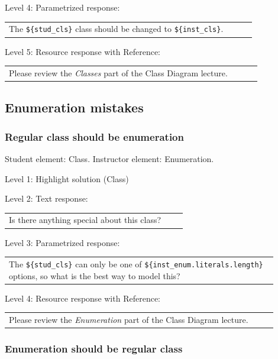 \noindent Level 4: Parametrized response: \medskip

\begin{tabular}{|p{0.9\linewidth}}
The \verb|${stud_cls}| class should be changed to \verb|${inst_cls}|.
\end{tabular} \medskip

\noindent Level 5: Resource response with Reference: \medskip

\begin{tabular}{|p{0.9\linewidth}}
Please review the \textit{Classes} part of the Class Diagram lecture.
\end{tabular} \medskip


\subsection{Enumeration mistakes}

\subsubsection{Regular class should be enumeration}

Student element: Class. Instructor element: Enumeration. \medskip

\noindent Level 1: Highlight solution (Class) \medskip

\noindent Level 2: Text response: \medskip

\begin{tabular}{|p{0.9\linewidth}}
Is there anything special about this class?
\end{tabular} \medskip

\noindent Level 3: Parametrized response: \medskip

\begin{tabular}{|p{0.9\linewidth}}
The \verb|${stud_cls}| can only be one of \verb|${inst_enum.literals.length}| options, so what is the best way to model this?
\end{tabular} \medskip

\noindent Level 4: Resource response with Reference: \medskip

\begin{tabular}{|p{0.9\linewidth}}
Please review the \textit{Enumeration} part of the Class Diagram lecture.
\end{tabular} \medskip


\subsubsection{Enumeration should be regular class}

